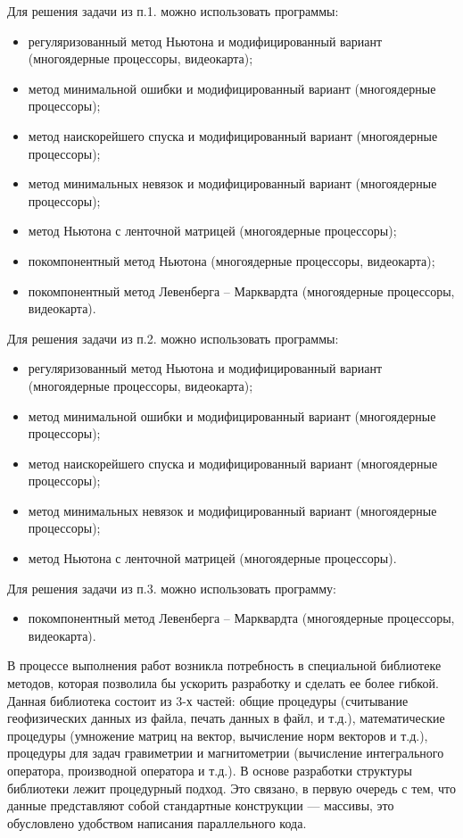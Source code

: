 Для решения задачи из п.1. можно использовать программы:
\begin{itemize}
	\item регуляризованный метод Ньютона и модифицированный вариант (многоядерные процессоры, видеокарта);
	\item метод минимальной ошибки и модифицированный вариант (многоядерные процессоры);
	\item метод наискорейшего спуска и модифицированный вариант (многоядерные процессоры);
	\item метод минимальных невязок и модифицированный вариант (многоядерные процессоры);
	\item метод Ньютона с ленточной матрицей (многоядерные процессоры);
	\item покомпонентный метод Ньютона (многоядерные процессоры, видеокарта);
	\item покомпонентный метод Левенберга -- Марквардта (многоядерные процессоры, видеокарта).
\end{itemize} 

Для решения задачи из п.2. можно использовать программы:
\begin{itemize}
	\item регуляризованный метод Ньютона и модифицированный вариант (многоядерные процессоры, видеокарта);
	\item метод минимальной ошибки и модифицированный вариант (многоядерные процессоры);
	\item метод наискорейшего спуска и модифицированный вариант (многоядерные процессоры);
	\item метод минимальных невязок и модифицированный вариант (многоядерные процессоры);
	\item метод Ньютона с ленточной матрицей (многоядерные процессоры).
\end{itemize} 

Для решения задачи из п.3. можно использовать программу:
\begin{itemize}
	\item покомпонентный метод Левенберга -- Марквардта (многоядерные процессоры, видеокарта).
\end{itemize}

В процессе выполнения работ возникла потребность в специальной библиотеке методов, которая позволила бы ускорить разработку и сделать ее более гибкой. Данная библиотека состоит из 3-х частей: общие процедуры (считывание геофизических данных из файла, печать данных в файл, и т.д.), математические процедуры (умножение матриц на вектор, вычисление норм векторов и т.д.), процедуры для задач гравиметрии и магнитометрии (вычисление интегрального оператора, производной оператора и т.д.). В основе разработки структуры библиотеки лежит процедурный подход. Это связано, в первую очередь с тем, что данные представляют собой стандартные конструкции --- массивы, это обусловлено удобством написания параллельного кода.

